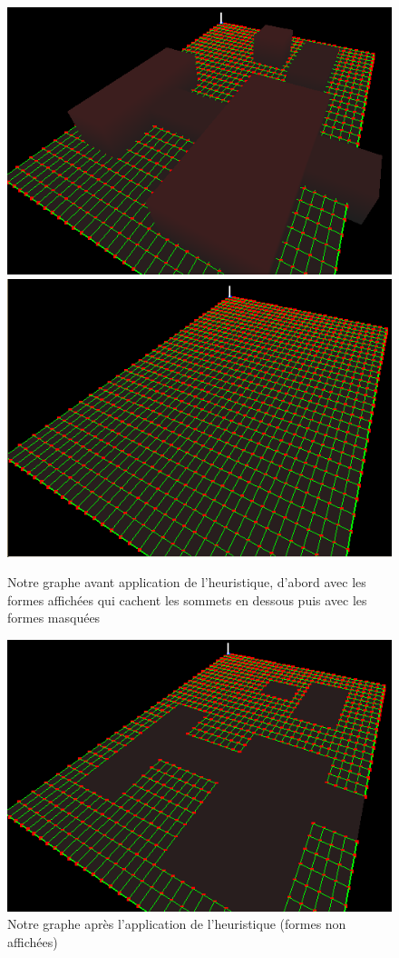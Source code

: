 \documentclass[a4paper,12pt]{report}
\begin{document}
\begin{figure}[h]
\centering
\includegraphics[scale=0.4]{Images/heuristique1.png}
\includegraphics[scale=0.4]{Images/heuristique2.png}
\caption{Notre graphe avant application de l'heuristique, d'abord avec les formes affichées qui cachent les sommets en dessous puis avec les formes masquées}
\includegraphics[scale=0.5]{Images/heuristique3.png}
\caption{Notre graphe après l'application de l'heuristique (formes non affichées)}
\end{figure}
\vspace{0.5cm}
\end{document}
